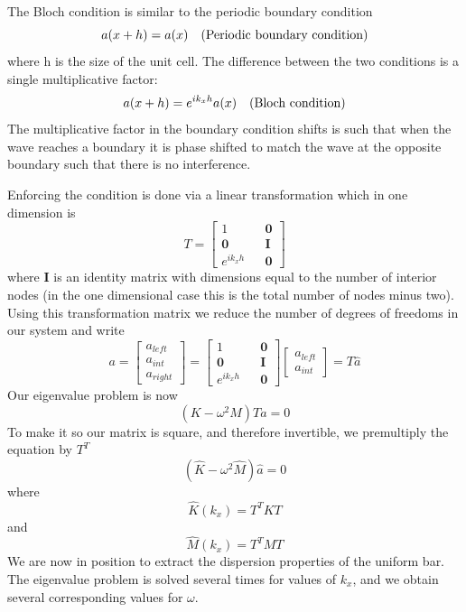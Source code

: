 \documentclass{article}
\begin{document}
The Bloch condition is similar to the periodic boundary condition
\begin{equation}
a(x+h) = a(x)\quad\textnormal{(Periodic boundary condition)}
\end{equation}
where h is the size of the unit cell. The difference between the two conditions 
is a single multiplicative factor:
\begin{equation}
a(x+h) = e^{ik_xh}a(x)\quad\textnormal{(Bloch condition)}
\end{equation}
The multiplicative factor in the boundary condition shifts is such that when 
the wave reaches a boundary it is phase shifted to match the wave at the 
opposite boundary such that there is no interference.

Enforcing the condition is done via a linear transformation which in one 
dimension is
\begin{equation}
T = 
\begin{bmatrix}
1 && \mathbf{0} \\
\mathbf{0} && \mathbf{I}\\
e^{ik_xh} && \mathbf{0}
\end{bmatrix}
\end{equation}
where $\mathbf{I}$ is an identity matrix with dimensions equal to the number of 
interior nodes (in the one dimensional case this is the total number of nodes 
minus two). Using this transformation matrix we reduce the number of degrees of 
freedoms in our system and write
\begin{equation}
a =
\begin{bmatrix}
a_{left} \\
a_{int} \\
a_{right}
\end{bmatrix}
= 
\begin{bmatrix}
1 && \mathbf{0} \\
\mathbf{0} && \mathbf{I}\\
e^{ik_xh} && \mathbf{0}
\end{bmatrix}
\begin{bmatrix}
a_{left} \\
a_{int}
\end{bmatrix}
= T \hat{a}
\end{equation}
Our eigenvalue problem is now
\begin{equation}
(K-\omega^2M)T\hat{a} = 0
\end{equation}
To make it so our matrix is square, and therefore invertible, we premultiply 
the equation by $T^T$
\begin{equation} \label{evalprob}
(\hat{K} - \omega^2 \hat{M})\hat{a} = 0
\end{equation}
where
\begin{equation}
\hat{K}(k_x) = T^T K T
\end{equation}
and 
\begin{equation}
\hat{M}(k_x) = T^T M T
\end{equation}
We are now in position to extract the dispersion properties of the uniform bar. 
The eigenvalue problem is solved several times for values of $k_x$, and we 
obtain several corresponding values for $\omega$. 
\end{document}
